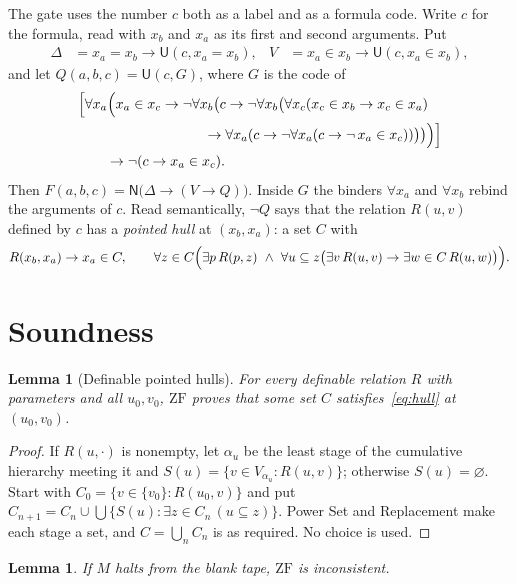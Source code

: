 \documentclass[11pt,letterpaper]{article}
\newtheorem{lemma}[theorem]{Lemma}
\newcommand{\ZF}{\mathrm{ZF}}
\newcommand{\Uc}{\mathsf{U}}
\newcommand{\Nc}{\mathsf{N}}
\begin{document}
The gate uses the number $c$ both as a label and as a formula code. Write
$c$ for the formula, read with $x_b$ and $x_a$ as its first and second
arguments. Put
\begin{align*}
 \Delta&=x_a=x_b\to\Uc(c,x_a=x_b), &
 V&=x_a\in x_b\to\Uc(c,x_a\in x_b),
\end{align*}
and let $Q(a,b,c)=\Uc(c,G)$, where $G$ is the code of
\[
 \begin{aligned}
 &\Bigl[\forall x_a\Bigl(x_a\in x_c\to\neg\forall x_b\bigl(c\to\neg
  \forall x_b\bigl(\forall x_c(x_c\in x_b\to x_c\in x_a)\\
 &\qquad\qquad\qquad\qquad\quad{}\to
  \forall x_a(c\to\neg\forall x_a(c\to\neg\,x_a\in x_c))\bigr)\bigr)
 \Bigr)\Bigr]\\
 &\qquad{}\to\neg(c\to x_a\in x_c).
 \end{aligned}
\]
Then $F(a,b,c)=\Nc\bigl(\Delta\to(V\to Q)\bigr)$. Inside $G$ the binders
$\forall x_a$ and $\forall x_b$ rebind the arguments of $c$. Read
semantically, $\neg Q$ says that the relation $R(u,v)$ defined by $c$ has a
\emph{pointed hull} at $(x_b,x_a)$: a set $C$ with
\begin{equation}\label{eq:hull}
 R(x_b,x_a)\to x_a\in C,\qquad
 \forall z\in C\Bigl(\exists p\,R(p,z)\ \wedge\
 \forall u\subseteq z\bigl(\exists v\,R(u,v)\to\exists w\in C\,R(u,w)\bigr)\Bigr).
\end{equation}

\section{Soundness}\label{sec:sound}

\begin{lemma}[Definable pointed hulls]\label{lem:hull}
For every definable relation $R$ with parameters and all $u_0,v_0$, $\ZF$
proves that some set $C$ satisfies~\eqref{eq:hull} at $(u_0,v_0)$.
\end{lemma}

\begin{proof}
If $R(u,\cdot)$ is nonempty, let $\alpha_u$ be the least stage of the
cumulative hierarchy meeting it and $S(u)=\{v\in V_{\alpha_u}:R(u,v)\}$;
otherwise $S(u)=\varnothing$. Start with $C_0=\{v\in\{v_0\}:R(u_0,v)\}$ and
put $C_{n+1}=C_n\cup\bigcup\{S(u):\exists z\in C_n\,(u\subseteq z)\}$.
Power Set and Replacement make each stage a set, and $C=\bigcup_nC_n$ is
as required. No choice is used.
\end{proof}

\begin{lemma}\label{lem:sound}
If $M$ halts from the blank tape, $\ZF$ is inconsistent.
\end{lemma}
\end{document}
